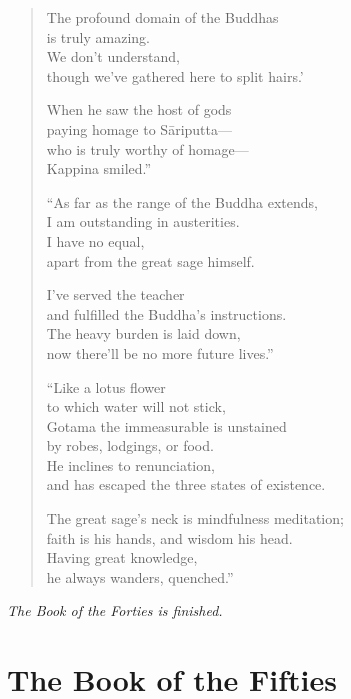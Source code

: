 \documentclass[12pt,openany]{book}%
\let\oldcontentsline\contentsline
\newcommand{\nopagecontentsline}[3]{\oldcontentsline{#1}{#2}{}}
\newcommand*{\scendsection}[1]{\begin{center}\textit{#1}\end{center}}
\begin{document}
\begin{verse}
The profound domain of the Buddhas \\
is truly amazing. \\
We don’t understand, \\
though we’ve gathered here to split hairs.’ 

When he saw the host of gods \\
paying homage to \textsanskrit{Sāriputta}—\\
who is truly worthy of homage—\\
Kappina smiled.” 

“As far as the range of the Buddha extends, \\
I am outstanding in austerities. \\
I have no equal, \\
apart from the great sage himself. 

I’ve served the teacher \\
and fulfilled the Buddha’s instructions. \\
The heavy burden is laid down, \\
now there’ll be no more future lives.” 

“Like a lotus flower \\
to which water will not stick, \\
Gotama the immeasurable is unstained \\
by robes, lodgings, or food. \\
He inclines to renunciation, \\
and has escaped the three states of existence. 

The great sage’s neck is mindfulness meditation; \\
faith is his hands, and wisdom his head. \\
Having great knowledge, \\
he always wanders, quenched.” 

%
\end{verse}

\scendsection{The Book of the Forties is finished. }

%
\part*{The Book of the Fifties}
\markboth{}{}
\addtocontents{toc}{\let\protect\contentsline\protect\oldcontentsline}
\end{document}
